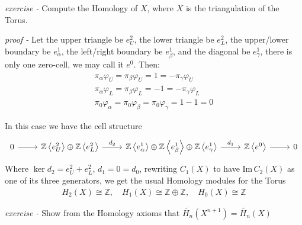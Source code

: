 \documentclass[11pt]{article}
\theoremstyle{definition}
\newcommand{\gen}[1]{\left\langle #1 \right\rangle}
\begin{document}

    \emph{exercise - }\label{HEx13} Compute the Homology of \(X\), where \(X\) is the triangulation of the Torus.

    \emph{proof - } Let the upper triangle be \(e_U^2\), the lower triangle be \(e_L^2\), the upper/lower boundary be \(e_\alpha^1\), the left/right boundary be \(e_\beta^1\), and the diagonal be \(e_\gamma^1\), there is only one zero-cell, we may call it \(e^0\). Then:
    \begin{align*}
        \pi_\alpha \varphi_U = \pi_\beta \varphi_U = 1 = - \pi_\gamma \varphi_U \\
        \pi_\alpha \varphi_L = \pi_\beta \varphi_L = -1 = - \pi_\gamma \varphi_L \\
        \pi_0 \varphi_\alpha = \pi_0 \varphi_\beta = \pi_0 \varphi_\gamma = 1 - 1 = 0
    \end{align*}

    In this case we have the cell structure
    \begin{equation*}
        \begin{tikzcd}
            0 \arrow[r] & \mathbb{Z}\gen{e^2_U} \oplus \mathbb{Z}\gen{e^2_L} \arrow[r,"{d_2}"] & \mathbb{Z} \gen{e^1_\alpha} \oplus \mathbb{Z} \gen{e^1_\beta} \oplus \mathbb{Z} \gen{e^1_\gamma} \arrow[r,"{d_1}"] &\mathbb{Z} \gen{e^0} \arrow[r] & 0
        \end{tikzcd}
    \end{equation*}
    Where \(\ker d_2 = e_U^2 + e_L^2\), \(d_1 = 0 = d_0\), rewriting \(C_1(X)\) to have \(\text{Im}\,C_2(X)\) as one of its three generators, we get the usual Homology modules for the Torus
    \begin{align*}
        H_2(X) \cong \mathbb{Z}, \quad H_1(X) \cong \mathbb{Z} \oplus \mathbb{Z}, \quad H_0(X) \cong \mathbb{Z}
    \end{align*}



    \emph{exercise - }\label{HEx14} Show from the Homology axioms that \(\tilde{H_n}(X^{n+1}) = \tilde{H_n}(X)\)
\end{document}
